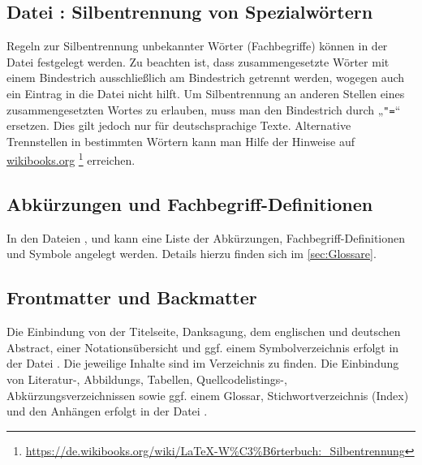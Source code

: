 \subsection[Datei \printfilepath{Hyphenation.tex}: Silbentrennung von Spezialwörtern]{Datei : Silbentrennung von Spezialwörtern}%
%
\label{sec:Hyphenation}
%
Regeln zur Silbentrennung unbekannter Wörter (\zB Fachbegriffe)
können in der Datei  festgelegt werden.
Zu beachten ist, dass zusammengesetzte Wörter mit einem Bindestrich
ausschließlich am Bindestrich getrennt werden,
wogegen auch ein Eintrag in die Datei  nicht hilft.
Um Silbentrennung an anderen Stellen eines zusammengesetzten Wortes zu erlauben,
muss man den Bindestrich durch „\verb+"=+“ ersetzen. Dies gilt jedoch nur für deutschsprachige Texte.
Alternative Trennstellen in bestimmten Wörtern kann man Hilfe der Hinweise auf 
\href{https://de.wikibooks.org/wiki/LaTeX-W%C3%B6rterbuch:_Silbentrennung}{wikibooks.org}%
\footnote{\url{https://de.wikibooks.org/wiki/LaTeX-W%C3%B6rterbuch:_Silbentrennung}}
erreichen.


\subsection[Abkürzungen und Fachbegriff-Definitionen]{Abkürzungen und Fachbegriff-Definitionen}%
%
%
%
%
\label{sec:Abkuerzungen}
%
In den Dateien
,
 und
kann eine Liste der Abkürzungen, Fachbegriff-Definitionen und Symbole angelegt werden.
Details hierzu finden sich im \cref{sec:Glossare}.


\subsection[Frontmatter und Backmatter]{Frontmatter und Backmatter}%
%
%
%
%
%
%
%
%
%
%
%
\label{sec:FrontmatterBackmatter}
%
Die Einbindung von der Titelseite, Danksagung, dem englischen und deutschen Abstract,
einer Notationsübersicht und ggf. einem Symbolverzeichnis
erfolgt in der Datei .
Die jeweilige Inhalte sind im Verzeichnis  zu finden.
Die Einbindung von Literatur-, Abbildungs, Tabellen, Quellcodelistings-, Abkürzungsverzeichnissen sowie ggf. einem Glossar, Stichwortverzeichnis (Index) und den Anhängen erfolgt in der Datei .
